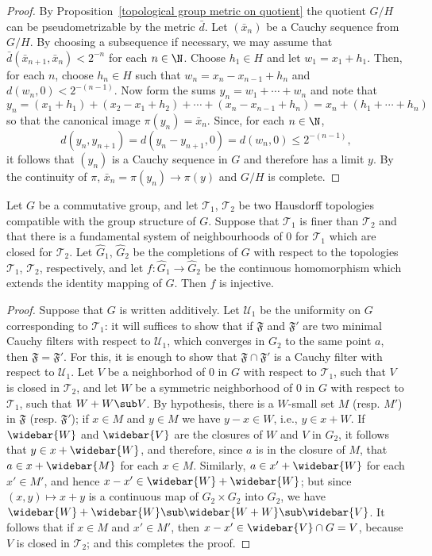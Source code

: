 \begin{proof}
By Proposition~\ref{topological group metric on quotient} the quotient $G/H$ can be pseudometrizable by the metric $\bar{d}$. Let $(\bar{x}_n)$ be a Cauchy sequence from $G/H$. By choosing a subsequence if necessary, we may assume that $\bar{d}(\bar{x}_{n+1},\bar{x}_n)<2^{-n}$ for each $n\in\N$. Choose $h_1\in H$ and let $w_1=x_1+h_1$. Then, for each $n$, choose $h_n\in H$ such that $w_n=x_n-x_{n-1}+h_n$ and $d(w_n,0)<2^{-(n-1)}$. Now form the sums $y_n=w_1+\cdots+w_n$ and note that
\[y_n=(x_1+h_1)+(x_2-x_1+h_2)+\cdots+(x_{n}-x_{n-1}+h_n)=x_n+(h_1+\cdots+h_n)\]
so that the canonical image $\pi(y_n)=\bar{x}_n$. Since, for each $n\in\N$,
\[d(y_n,y_{n+1})=d(y_n-y_{n+1},0)=d(w_n,0)\leq 2^{-(n-1)},\]
it follows that $(y_n)$ is a Cauchy sequence in $G$ and therefore has a limit $y$. By the continuity of $\pi$, $\bar{x}_n=\pi(y_n)\to\pi(y)$ and $G/H$ is complete.
\end{proof}
\begin{proposition}\label{topological group abelian two topo complete prop}
Let $G$ be a commutative group, and let $\mathcal{T}_1$, $\mathcal{T}_2$ be two Hausdorff topologies compatible with the group structure of $G$. Suppose that $\mathcal{T}_1$ is finer than $\mathcal{T}_2$ and that there is a fundamental system of neighbourhoods of $0$ for $\mathcal{T}_1$ which are closed for $\mathcal{T}_2$. Let $\widehat{G}_1$, $\widehat{G}_2$ be the completions of $G$ with respect to the topologies $\mathcal{T}_1$, $\mathcal{T}_2$, respectively, and let $f:\widehat{G}_1\to\widehat{G}_2$ be the continuous homomorphism which extends the identity mapping of $G$. Then $f$ is injective.
\end{proposition}
\begin{proof}
Suppose that $G$ is written additively. Let $\mathcal{U}_1$ be the uniformity on $G$ corresponding to $\mathcal{T}_1$: it will suffices to show that if $\mathfrak{F}$ and $\mathfrak{F}'$ are two minimal Cauchy filters with respect to $\mathcal{U}_1$, which converges in $G_2$ to the same point $a$, then $\mathfrak{F}=\mathfrak{F}'$. For this, it is enough to show that $\mathfrak{F}\cap\mathfrak{F}'$ is a Cauchy filter with respect to $\mathcal{U}_1$. Let $V$ be a neighborhod of $0$ in $G$ with respect to $\mathcal{T}_1$, such that $V$ is closed in $\mathcal{T}_2$, and let $W$ be a symmetric neighborhood of $0$ in $G$ with respect to $\mathcal{T}_1$, such that $W+W\sub V$. By hypothesis, there is a $W$-small set $M$ (resp. $M'$) in $\mathfrak{F}$ (resp. $\mathfrak{F}'$); if $x\in M$ and $y\in M$ we have $y-x\in W$, i.e., $y\in x+W$. If $\widebar{W}$ and $\widebar{V}$ are the closures of $W$ and $V$ in $G_2$, it follows that $y\in x+\widebar{W}$, and therefore, since $a$ is in the closure of $M$, that $a\in x+\widebar{M}$ for each $x\in M$. Similarly, $a\in x'+\widebar{W}$ for each $x'\in M'$, and hence $x-x'\in\widebar{W}+\widebar{W}$; but since $(x,y)\mapsto x+y$ is a continuous map of $G_2\times G_2$ into $G_2$, we have $\widebar{W}+\widebar{W}\sub\widebar{W+W}\sub\widebar{V}$. It follows that if $x\in M$ and $x'\in M'$, then $x-x'\in\widebar{V}\cap G=V$, because $V$ is closed in $\mathcal{T}_2$; and this completes the proof.
\end{proof}
